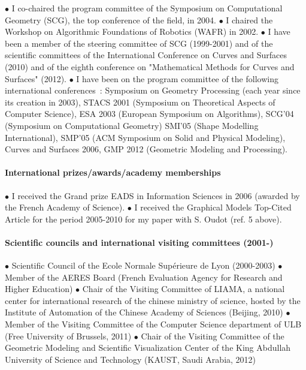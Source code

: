 
$\bullet$ I co-chaired the program committee of the  Symposium on Computational Geometry (SCG), the top conference of the field,  in 2004.
$\bullet$ 
I chaired the Workshop on Algorithmic Foundations of Robotics (WAFR) in 2002.
$\bullet$ 
I have been a member of the steering committee of SCG  (1999-2001) and of the scientific committees of the International Conference on Curves and Surfaces (2010) and of  the eighth conference on "Mathematical Methods for Curves and Surfaces" (2012).
$\bullet$ 
I have been on the program committee of  the following international conferences~: Symposium on Geometry Processing (each year since its creation in 2003), 
STACS 2001 (Symposium on Theoretical Aspects of Computer Science),
ESA 2003 (European Symposium on Algorithms),
SCG'04 (Symposium on Computational Geometry)
SMI'05 (Shape Modelling International),
SMP'05 (ACM Symposium on Solid and Physical Modeling),
Curves and Surfaces 2006,
GMP 2012 (Geometric Modeling 
and Processing).

\paragraph{International prizes/awards/academy memberships} \mbox{}

$\bullet$ I received the Grand prize EADS in Information Sciences in 2006 (awarded by the French Academy of Science).  $\bullet$ I received the Graphical Models Top-Cited Article for the period 2005-2010 for  my paper with S. Oudot (ref. 5 above).

\paragraph{Scientific councils and international visiting committees (2001-)} \mbox{}


$\bullet$  Scientific Council of the Ecole Normale Sup\'erieure de Lyon (2000-2003)
$\bullet$  Member of the AERES Board (French Evaluation Agency for
  Research and Higher Education)
$\bullet$  Chair of the Visiting Committee of LIAMA, a  national center for international research of the chinese ministry of science, hosted by the Institute of Automation of the Chinese Academy of Sciences  (Beijing, 2010)
$\bullet$  Member of the Visiting Committee of the Computer Science department of ULB (Free University of Brussels, 2011)
$\bullet$    Chair of the Visiting Committee of the Geometric Modeling and Scientific Visualization  Center of the King Abdullah University of Science and Technology (KAUST, Saudi Arabia, 2012)




